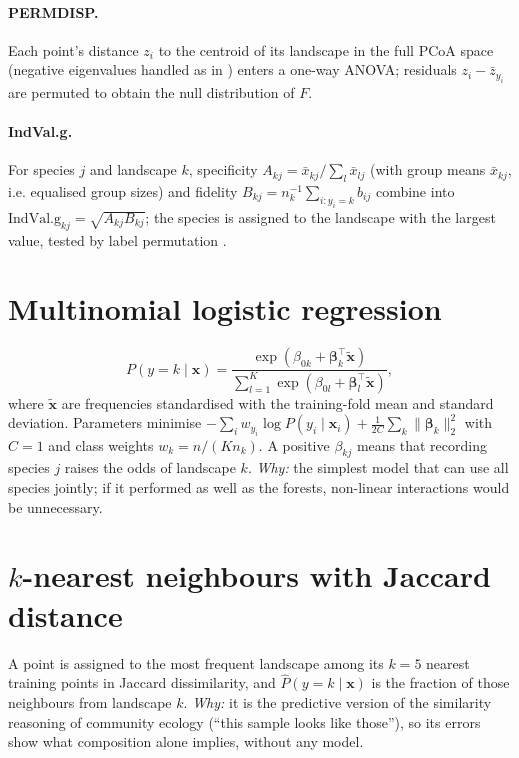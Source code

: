 \documentclass[10pt,a4paper,twocolumn]{article}
\begin{document}
\paragraph{PERMDISP.} Each point's distance $z_i$ to the centroid of its landscape in the full PCoA
space (negative eigenvalues handled as in \citealp{anderson2006}) enters a one-way ANOVA; residuals
$z_i-\bar z_{y_i}$ are permuted to obtain the null distribution of $F$.

\paragraph{IndVal.g.}\label{app:species} For species $j$ and landscape $k$, specificity
$A_{kj}=\bar x_{kj}/\sum_{l}\bar x_{lj}$ (with group means $\bar x_{kj}$, i.e. equalised group sizes)
and fidelity $B_{kj}=n_k^{-1}\sum_{i:y_i=k}b_{ij}$ combine into
$\mathrm{IndVal.g}_{kj}=\sqrt{A_{kj}B_{kj}}$; the species is assigned to the landscape with the
largest value, tested by label permutation \citep{dufrene1997,decaceres2009}.

\section{Multinomial logistic regression}\label{app:logistic}
\[
P(y=k\mid\mathbf{x})=\frac{\exp(\beta_{0k}+\bm\beta_k^\top\tilde{\mathbf{x}})}
{\sum_{l=1}^{K}\exp(\beta_{0l}+\bm\beta_l^\top\tilde{\mathbf{x}})},
\]
where $\tilde{\mathbf{x}}$ are frequencies standardised with the training-fold mean and standard
deviation. Parameters minimise
$-\sum_i w_{y_i}\log P(y_i\mid\mathbf{x}_i)+\tfrac{1}{2C}\sum_k\|\bm\beta_k\|_2^2$ with $C=1$ and class
weights $w_k=n/(K n_k)$. A positive $\beta_{kj}$ means that recording species $j$ raises the odds of
landscape $k$. \emph{Why:} the simplest model that can use all species jointly; if it performed as
well as the forests, non-linear interactions would be unnecessary.

\section{$k$-nearest neighbours with Jaccard distance}\label{app:knn}
A point is assigned to the most frequent landscape among its $k=5$ nearest training points in Jaccard
dissimilarity, and $\hat P(y=k\mid\mathbf{x})$ is the fraction of those neighbours from landscape $k$.
\emph{Why:} it is the predictive version of the similarity reasoning of community ecology (``this
sample looks like those''), so its errors show what composition alone implies, without any model.
\end{document}
